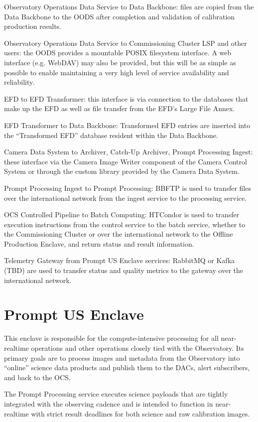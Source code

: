 \documentclass[DM,toc,lsstdraft]{lsstdoc}
\begin{document}
Observatory Operations Data Service to Data Backbone: files are copied from the Data Backbone to the OODS after completion and validation of calibration production results.

Observatory Operations Data Service to Commissioning Cluster LSP and other users: the OODS provides a mountable POSIX filesystem interface.
A web interface (e.g. WebDAV) may also be provided, but this will be as simple as possible to enable maintaining a very high level of service availability and reliability.

EFD to EFD Transformer: this interface is via connection to the
databases that make up the EFD as well as file transfer from the EFD's
Large File Annex.

EFD Transformer to Data Backbone: Transformed EFD entries are inserted
into the ``Transformed EFD'' database resident within the Data Backbone.

Camera Data System to Archiver, Catch-Up Archiver, Prompt Processing
Ingest: these interface via the Camera Image Writer component of the Camera Control System or through the custom library provided by the
Camera Data System.

Prompt Processing Ingest to Prompt Processing: BBFTP is used to transfer
files over the international network from the ingest service to the
processing service.

OCS Controlled Pipeline to Batch Computing: HTCondor is
used to transfer execution instructions
from the control service to the batch service, whether to the Commissioning Cluster or over the international network to the Offline Production Enclave, and return status and
result information.

Telemetry Gateway from Prompt US Enclave services: RabbitMQ or Kafka (TBD) are
used to transfer status and quality metrics to the gateway over the
international network.

\section{Prompt US Enclave}\label{prompt-us-enclave}

This enclave is responsible for the compute-intensive processing for all
near-realtime operations and other operations closely tied with the
Observatory. Its primary goals are to process images and metadata from
the Observatory into ``online'' science data products and publish them
to the DACs, alert subscribers, and back to the OCS.

The Prompt Processing service executes science payloads that are tightly integrated with the observing cadence and is intended to function in near-realtime with strict result deadlines for both science and raw calibration images.
\end{document}
